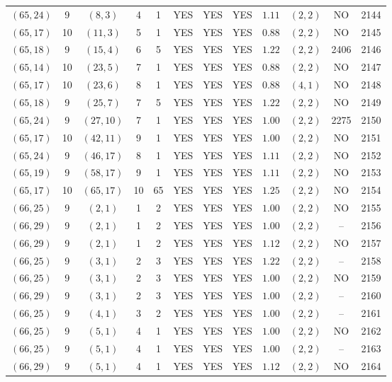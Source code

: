 \begin{longtable}{|c|c|c|c|c|c|c|c|c|c|c|c|}
$(65,24)$ & 9 & $(8,3)$ & 4 & 1 & YES & YES & YES & $1.11$ & $(2,2)$ & NO & 2144\\
$(65,17)$ & 10 & $(11,3)$ & 5 & 1 & YES & YES & YES & $0.88$ & $(2,2)$ & NO & 2145\\
$(65,18)$ & 9 & $(15,4)$ & 6 & 5 & YES & YES & YES & $1.22$ & $(2,2)$ & 2406 & 2146\\
$(65,14)$ & 10 & $(23,5)$ & 7 & 1 & YES & YES & YES & $0.88$ & $(2,2)$ & NO & 2147\\
$(65,17)$ & 10 & $(23,6)$ & 8 & 1 & YES & YES & YES & $0.88$ & $(4,1)$ & NO & 2148\\
$(65,18)$ & 9 & $(25,7)$ & 7 & 5 & YES & YES & YES & $1.22$ & $(2,2)$ & NO & 2149\\
$(65,24)$ & 9 & $(27,10)$ & 7 & 1 & YES & YES & YES & $1.00$ & $(2,2)$ & 2275 & 2150\\
$(65,17)$ & 10 & $(42,11)$ & 9 & 1 & YES & YES & YES & $1.00$ & $(2,2)$ & NO & 2151\\
$(65,24)$ & 9 & $(46,17)$ & 8 & 1 & YES & YES & YES & $1.11$ & $(2,2)$ & NO & 2152\\
$(65,19)$ & 9 & $(58,17)$ & 9 & 1 & YES & YES & YES & $1.11$ & $(2,2)$ & NO & 2153\\
$(65,17)$ & 10 & $(65,17)$ & 10 & 65 & YES & YES & YES & $1.25$ & $(2,2)$ & NO & 2154\\
$(66,25)$ & 9 & $(2,1)$ & 1 & 2 & YES & YES & YES & $1.00$ & $(2,2)$ & NO & 2155\\
$(66,29)$ & 9 & $(2,1)$ & 1 & 2 & YES & YES & YES & $1.00$ & $(2,2)$ & -- & 2156\\
$(66,29)$ & 9 & $(2,1)$ & 1 & 2 & YES & YES & YES & $1.12$ & $(2,2)$ & NO & 2157\\
$(66,25)$ & 9 & $(3,1)$ & 2 & 3 & YES & YES & YES & $1.22$ & $(2,2)$ & -- & 2158\\
$(66,25)$ & 9 & $(3,1)$ & 2 & 3 & YES & YES & YES & $1.00$ & $(2,2)$ & NO & 2159\\
$(66,29)$ & 9 & $(3,1)$ & 2 & 3 & YES & YES & YES & $1.00$ & $(2,2)$ & -- & 2160\\
$(66,25)$ & 9 & $(4,1)$ & 3 & 2 & YES & YES & YES & $1.00$ & $(2,2)$ & -- & 2161\\
$(66,25)$ & 9 & $(5,1)$ & 4 & 1 & YES & YES & YES & $1.00$ & $(2,2)$ & NO & 2162\\
$(66,25)$ & 9 & $(5,1)$ & 4 & 1 & YES & YES & YES & $1.00$ & $(2,2)$ & -- & 2163\\
$(66,29)$ & 9 & $(5,1)$ & 4 & 1 & YES & YES & YES & $1.12$ & $(2,2)$ & NO & 2164\\

\end{longtable}
